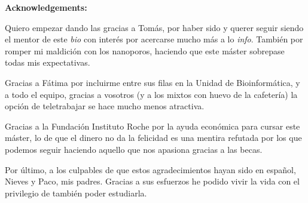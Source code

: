\vspace{0.5cm}
    \noindent\textbf{\large Acknowledgements:}

    Quiero empezar dando las gracias a Tomás, por haber sido y querer 
    seguir siendo el mentor de este \textit{bio} con interés por acercarse
    mucho más a lo \textit{info}. También por romper mi maldición con los nanoporos,
    haciendo que este máster sobrepase todas mis expectativas.

    Gracias a Fátima por incluirme entre sus filas en la Unidad de Bioinformática,
    y a todo el equipo, gracias a vosotros (y a los mixtos con huevo de la cafetería) 
    la opción de teletrabajar se hace mucho menos atractiva.

    Gracias a la Fundación Instituto Roche por la ayuda económica para cursar
    este máster, lo de que el dinero no da la felicidad es una mentira 
    refutada por los que podemos seguir haciendo aquello que nos apasiona
    gracias a las becas.
    
    Por último, a los culpables de que estos agradecimientos hayan sido en 
    español, Nieves y Paco, mis padres. Gracias a sus esfuerzos he podido vivir 
    la vida con el privilegio de también poder estudiarla.


